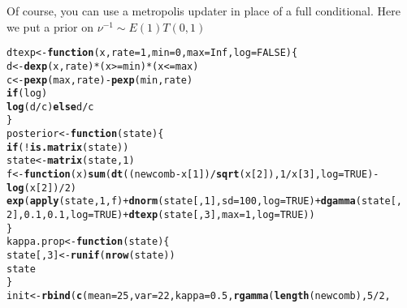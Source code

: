 \documentclass{article}\usepackage[]{graphicx}\usepackage[]{color}
\makeatletter
\newcommand{\hlnum}[1]{\textcolor[rgb]{0.686,0.059,0.569}{#1}}%
\newcommand{\hlopt}[1]{\textcolor[rgb]{0,0,0}{#1}}%
\newcommand{\hlstd}[1]{\textcolor[rgb]{0.345,0.345,0.345}{#1}}%
\newcommand{\hlkwa}[1]{\textcolor[rgb]{0.161,0.373,0.58}{\textbf{#1}}}%
\newcommand{\hlkwb}[1]{\textcolor[rgb]{0.69,0.353,0.396}{#1}}%
\newcommand{\hlkwc}[1]{\textcolor[rgb]{0.333,0.667,0.333}{#1}}%
\newcommand{\hlkwd}[1]{\textcolor[rgb]{0.737,0.353,0.396}{\textbf{#1}}}%
\newenvironment{kframe}{%
 \def\at@end@of@kframe{}%
 \ifinner\ifhmode%
  \def\at@end@of@kframe{\end{minipage}}%
  \begin{minipage}{\columnwidth}%
 \fi\fi%
 \def\FrameCommand##1{\hskip\@totalleftmargin \hskip-\fboxsep
 \colorbox{shadecolor}{##1}\hskip-\fboxsep
     \hskip-\linewidth \hskip-\@totalleftmargin \hskip\columnwidth}%
 \MakeFramed {\advance\hsize-\width
   \@totalleftmargin\z@ \linewidth\hsize
   \@setminipage}}%
 {\par\unskip\endMakeFramed%
 \at@end@of@kframe}
\newenvironment{knitrout}{}{} %
\makeatother
\begin{document}
Of course, you can use a metropolis updater in place of a full
conditional. Here we put a prior on $\nu^{-1} \sim E(1)T(0,1)$
\begin{knitrout}
\color{fgcolor}\begin{kframe}
\begin{alltt}
\hlstd{dtexp} \hlkwb{<-} \hlkwa{function}\hlstd{(}\hlkwc{x}\hlstd{,} \hlkwc{rate} \hlstd{=} \hlnum{1}\hlstd{,} \hlkwc{min} \hlstd{=} \hlnum{0}\hlstd{,} \hlkwc{max} \hlstd{=} \hlnum{Inf}\hlstd{,} \hlkwc{log} \hlstd{=} \hlnum{FALSE}\hlstd{) \{}
    \hlstd{d} \hlkwb{<-} \hlkwd{dexp}\hlstd{(x, rate)} \hlopt{*} \hlstd{(x} \hlopt{>=} \hlstd{min)} \hlopt{*} \hlstd{(x} \hlopt{<=} \hlstd{max)}
    \hlstd{c} \hlkwb{<-} \hlkwd{pexp}\hlstd{(max, rate)} \hlopt{-} \hlkwd{pexp}\hlstd{(min, rate)}
    \hlkwa{if} \hlstd{(log)}
        \hlkwd{log}\hlstd{(d}\hlopt{/}\hlstd{c)} \hlkwa{else} \hlstd{d}\hlopt{/}\hlstd{c}
\hlstd{\}}
\hlstd{posterior} \hlkwb{<-} \hlkwa{function}\hlstd{(}\hlkwc{state}\hlstd{) \{}
    \hlkwa{if} \hlstd{(}\hlopt{!}\hlkwd{is.matrix}\hlstd{(state))}
        \hlstd{state} \hlkwb{<-} \hlkwd{matrix}\hlstd{(state,} \hlnum{1}\hlstd{)}
    \hlstd{f} \hlkwb{<-} \hlkwa{function}\hlstd{(}\hlkwc{x}\hlstd{)} \hlkwd{sum}\hlstd{(}\hlkwd{dt}\hlstd{((newcomb} \hlopt{-} \hlstd{x[}\hlnum{1}\hlstd{])}\hlopt{/}\hlkwd{sqrt}\hlstd{(x[}\hlnum{2}\hlstd{]),} \hlnum{1}\hlopt{/}\hlstd{x[}\hlnum{3}\hlstd{],} \hlkwc{log} \hlstd{=} \hlnum{TRUE}\hlstd{)} \hlopt{-}
        \hlkwd{log}\hlstd{(x[}\hlnum{2}\hlstd{])}\hlopt{/}\hlnum{2}\hlstd{)}
    \hlkwd{exp}\hlstd{(}\hlkwd{apply}\hlstd{(state,} \hlnum{1}\hlstd{, f)} \hlopt{+} \hlkwd{dnorm}\hlstd{(state[,} \hlnum{1}\hlstd{],} \hlkwc{sd} \hlstd{=} \hlnum{100}\hlstd{,} \hlkwc{log} \hlstd{=} \hlnum{TRUE}\hlstd{)} \hlopt{+} \hlkwd{dgamma}\hlstd{(state[,}
        \hlnum{2}\hlstd{],} \hlnum{0.1}\hlstd{,} \hlnum{0.1}\hlstd{,} \hlkwc{log} \hlstd{=} \hlnum{TRUE}\hlstd{)} \hlopt{+} \hlkwd{dtexp}\hlstd{(state[,} \hlnum{3}\hlstd{],} \hlkwc{max} \hlstd{=} \hlnum{1}\hlstd{,} \hlkwc{log} \hlstd{=} \hlnum{TRUE}\hlstd{))}
\hlstd{\}}
\hlstd{kappa.prop} \hlkwb{<-} \hlkwa{function}\hlstd{(}\hlkwc{state}\hlstd{) \{}
    \hlstd{state[,} \hlnum{3}\hlstd{]} \hlkwb{<-} \hlkwd{runif}\hlstd{(}\hlkwd{nrow}\hlstd{(state))}
    \hlstd{state}
\hlstd{\}}
\hlstd{init} \hlkwb{<-} \hlkwd{rbind}\hlstd{(}\hlkwd{c}\hlstd{(}\hlkwc{mean} \hlstd{=} \hlnum{25}\hlstd{,} \hlkwc{var} \hlstd{=} \hlnum{22}\hlstd{,} \hlkwc{kappa} \hlstd{=} \hlnum{0.5}\hlstd{,} \hlkwd{rgamma}\hlstd{(}\hlkwd{length}\hlstd{(newcomb),} \hlnum{5}\hlopt{/}\hlnum{2}\hlstd{,}

\end{alltt}
\end{kframe}
\end{knitrout}
\end{document}

